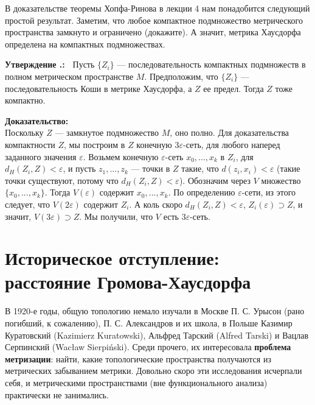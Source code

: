 \documentclass[12pt]{book}
\def\endproof{\hbox{\vrule width 5pt height 5pt depth 0pt}}
\renewcommand{\epsilon}{\varepsilon}
\theoremstyle{upshape}
\theoremstyle{generic}
\theoremstyle{upshapenonumber}
\newtheorem{ukazanie}{Указание}[section]
\newcommand{\следствие}{%
     \refstepcounter{teorema}
     {\noindent\bf Следствие \thechapter.\arabic{teorema}:\ }}
\newcommand{\пример}{%
     \refstepcounter{teorema}
     {\noindent\bf Пример \thechapter.\arabic{teorema}:\ }}
\newcommand{\лемма}{%
     \refstepcounter{teorema}
     {\noindent\bf Лемма \thechapter.\arabic{teorema}:\ }}
\newcommand{\теорема}{%
     \refstepcounter{teorema}
     {\noindent\bf Теорема \thechapter.\arabic{teorema}:\ }}
\newcommand{\утверждение}{%
     \refstepcounter{teorema}
     {\noindent\bf Утверждение \thechapter.\arabic{teorema}:\ }}
\def\хфилл{\hfill}
\def\ноиндент{\noindent}
\def\бф{\bf}
\def\указание{\begin{ukazanie}}
\begin{document}
\hfill

В доказательстве теоремы Хопфа-Ринова в
лекции 4 нам понадобится следующий простой результат.
Заметим, что любое компактное подмножество
метрического пространства замкнуто и ограничено
(докажите). А значит, метрика Хаусдорфа определена
на компактных подмножествах.

\хфилл

\утверждение \label{_predel_compa_Utverzhdenie_}
Пусть $\{Z_i\}$ --- последовательность компактных 
подмножеств в полном метрическом пространстве $M$.
Предположим, что $\{Z_i\}$ --- последовательность Коши
в метрике Хаусдорфа, а $Z$ ее предел. Тогда $Z$
тоже компактно.

\хфилл

\ноиндент
{\бф Доказательство:} \\
Поскольку $Z$ --- замкнутое подмножество $M$, оно полно.
Для доказательства компактности $Z$, мы построим
в $Z$ конечную $3\epsilon$-сеть, для любого наперед заданного
значения $\epsilon$. Возьмем конечную
$\epsilon$-сеть $x_0, ..., x_k$ в $Z_i$, для $d_H(Z_i, Z) <\epsilon$,
и пусть $z_1, ..., z_k$ --- точки в $Z$ такие, что
$d(z_i, x_i)< \epsilon$ (такие точки существуют,
потому что $d_H(Z_i, Z) <\epsilon$).
Обозначим через $V$ множество $\{x_0, ..., x_k\}$.
Тогда $V(\epsilon)$ содержит  $x_0, ..., x_k$.
По определению $\epsilon$-сети, из этого следует,
что $V(2\epsilon)$ содержит $Z_i$. А коль скоро
$d_H(Z_i, Z) <\epsilon$, $Z_i(\epsilon) \supset Z$,
и значит, $V(3\epsilon)\supset Z$.
Мы получили, что $V$ есть $3\epsilon$-сеть.
\endproof


\section{Историческое отступление: \\
расстояние Громова-Хаусдорфа}


В 1920-е годы, общую топологию немало изучали
в Москве П. С. Урысон (рано погибший, к сожалению),
П. С. Александров и их школа, в Польше Казимир Куратовский
(Kazimierz Kuratowski), Альфред Тарский (Alfred Tarski)
и Вацлав Серпинский (Wac\l aw Sierpi\'nski). 
Среди прочего, их интересовала {\бф проблема метризации}:
найти, какие топологические пространства получаются
из метрических забыванием метрики. Довольно скоро эти исследования 
исчерпали себя, и метрическими пространствами
(вне функционального анализа) практически не занимались.
\end{document}
